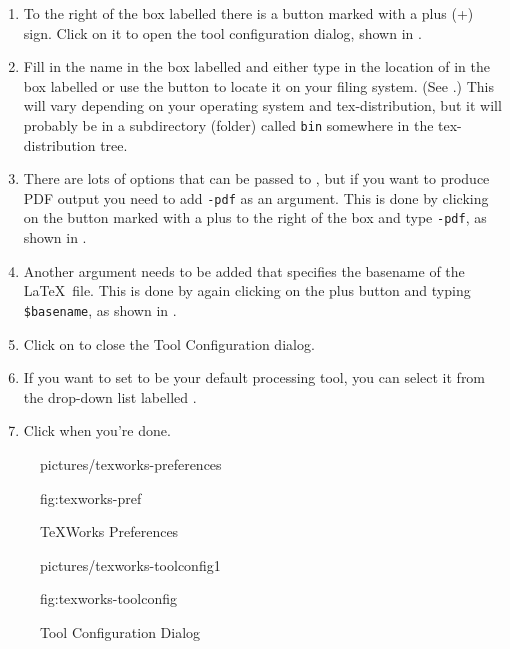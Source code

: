\begin{enumerate}
\item To the right of the box
labelled  there is a button marked with a plus
(+) sign. Click on it to open the tool configuration dialog, shown
in .

\item Fill in the name  in the box labelled  and either type
in the location of  in the box labelled  
or use the  button to locate it on your filing system.
(See .) This will vary depending
on your operating system and \gls{tex}-distribution, but it will
probably be in a subdirectory (folder) called \texttt{bin} somewhere
in the \gls*{tex}-distribution tree.

\item There are lots of options that can be passed to
, but if you want to produce PDF output you need to
add \texttt{-pdf} as an argument. This is done by clicking on the
button marked with a plus to the right of the  box and
type \texttt{-pdf}, as shown in .

\item Another argument needs to be added that specifies the
basename of the \LaTeX\ file. This is done by again clicking on the
plus button and typing \verb|$basename|, as shown in
 .

\item Click on  to close the Tool Configuration dialog.

\item If you want to set  to be your default
processing tool, you can select it from the drop-down list labelled
.

\item Click  when you're done.
\end{enumerate}

\begin{figure}[htbp]
\figconts
 {pictures/texworks-preferences}
 {%
    \caption{TeXWorks Preferences}
 }
 {fig:texworks-pref} 
\end{figure}

\begin{figure}[htbp]
\figconts
 {pictures/texworks-toolconfig1}
 {%
    \caption{Tool Configuration Dialog}
 }
 {fig:texworks-toolconfig} 
\end{figure}

